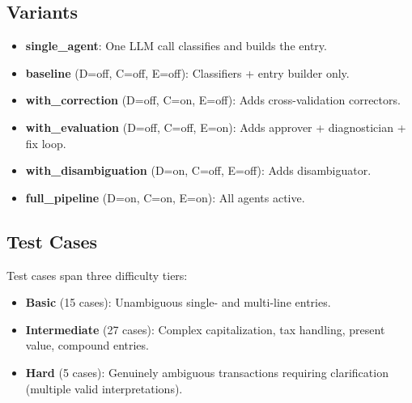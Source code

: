 \documentclass[11pt, a4paper]{article}
\begin{document}
\subsection{Variants}
\begin{itemize}
  \item \textbf{single\_agent}: One LLM call classifies and builds the entry.
  \item \textbf{baseline} (D=off, C=off, E=off): Classifiers + entry builder only.
  \item \textbf{with\_correction} (D=off, C=on, E=off): Adds cross-validation correctors.
  \item \textbf{with\_evaluation} (D=off, C=off, E=on): Adds approver + diagnostician + fix loop.
  \item \textbf{with\_disambiguation} (D=on, C=off, E=off): Adds disambiguator.
  \item \textbf{full\_pipeline} (D=on, C=on, E=on): All agents active.
\end{itemize}

\subsection{Test Cases}
Test cases span three difficulty tiers:
\begin{itemize}
  \item \textbf{Basic} (15 cases): Unambiguous single- and multi-line entries.
  \item \textbf{Intermediate} (27 cases): Complex capitalization, tax handling,
        present value, compound entries.
  \item \textbf{Hard} (5 cases): Genuinely ambiguous transactions requiring
        clarification (multiple valid interpretations).
\end{itemize}
\end{document}
